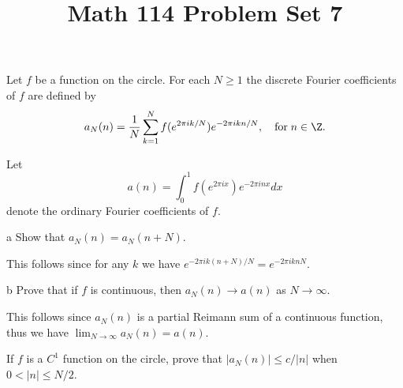 \documentclass[11pt,letterpaper]{article}
\title{\textbf{Math 114 Problem Set 7}}
\begin{document}
\maketitle

\begin{problem}
    Let $f$ be a function on the circle. For each $N \geq 1$ the discrete Fourier coefficients of $f$ are defined by
\[
a_N(n) = \frac1N\sum_{k=1}^N f(e^{2\pi i k/N})e^{-2\pi i kn/N},\quad\text{for}\;n\in \Z.
\]
\end{problem}

\begin{solution}
   \quad Let
\[
a(n) = \int_0^1f(e^{2\pi i x})e^{-2\pi i nx}dx
\]
denote the ordinary Fourier coefficients of $f$.
    \begin{partproblem}{a}
        Show that $a_N(n)=a_N(n+N)$.
    \end{partproblem}
    
    \quad This follows since for any $k$ we have $e^{-2\pi i k(n+N) /N} = e^{-2\pi ikn N}$.

    \begin{partproblem}{b}
        Prove that if $f$ is continuous, then $a_N(n) \to a(n)$ as $N \to \infty$.
    \end{partproblem}

    \quad This follows since $a_N(n)$ is a partial Reimann sum of a continuous function, thus we have $\lim_{N\to \infty} a_N(n) = a(n)$.
\end{solution}

\begin{problem}
    If $f$ is a $C^1$ function on the circle, prove that $|a_N(n)| \leq c/|n|$ when $0 < |n| \leq N/2$.%
\end{problem}
\end{document}
